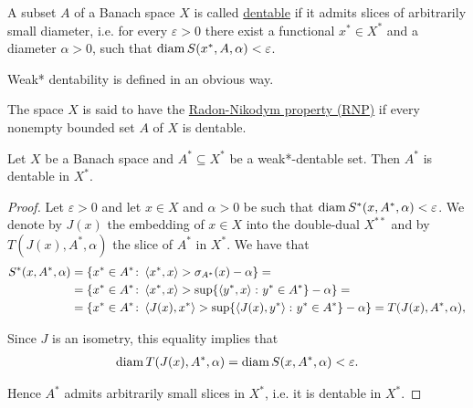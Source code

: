 \begin{definition}\cite[definition 5.1]{Phelps1993}
  \label{def:dentability}
  A subset $A$ of a Banach space $X$ is called \ul{dentable} if it admits slices of arbitrarily small diameter, i.e. for every $\varepsilon > 0$ there exist a functional $x^* \in X^*$ and a diameter $\alpha > 0$, such that $\operatorname{diam} S(x^*, A, \alpha) < \varepsilon$.

  Weak* dentability is defined in an obvious way.
\end{definition}

\begin{definition}\cite[definition 5.2]{Phelps1993}
  \label{def:radon-nikodym-property}
  The space $X$ is said to have the \ul{Radon-Nikodym property (RNP)} if every nonempty bounded set $A$ of $X$ is dentable.
\end{definition}

\begin{proposition}
  \label{thm:weak_dentable_sets_are_dentable}
  Let $X$ be a Banach space and $A^* \subseteq X^*$ be a weak*-dentable set. Then $A^*$ is dentable in $X^*$.
\end{proposition}
\begin{proof}
  Let $\varepsilon > 0$ and let $x \in X$ and $\alpha > 0$ be such that $\operatorname{diam} S^*(x, A^*, \alpha) < \varepsilon$.
  We denote by $J(x)$ the embedding of $x \in X$ into the double-dual $X^{**}$ and by $T(J(x), A^*, \alpha)$ the slice of $A^*$ in $X^*$. We have that
  \begin{align*}
    S^*(x, A^*, \alpha)
    &=
    \{ x^* \in A^* \colon \left\langle x^*, x \right\rangle > \sigma_{A^*}(x) - \alpha \}
    = \\ &=
    \{ x^* \in A^* \colon \left\langle x^*, x \right\rangle > \sup \{ \left\langle y^*, x \right\rangle \colon y^* \in A^* \} - \alpha \}
    = \\ &=
    \{ x^* \in A^* \colon \left\langle J(x), x^* \right\rangle > \sup \{ \left\langle J(x), y^* \right\rangle \colon y^* \in A^* \} - \alpha \}
    =
    T(J(x), A^*, \alpha),
  \end{align*}

  Since $J$ is an isometry, this equality implies that
  \begin{align*}
    \operatorname{diam} T(J(x), A^*, \alpha) = \operatorname{diam} S(x, A^*, \alpha) < \varepsilon.
  \end{align*}

  Hence $A^*$ admits arbitrarily small slices in $X^*$, i.e. it is dentable in $X^*$.
\end{proof}
